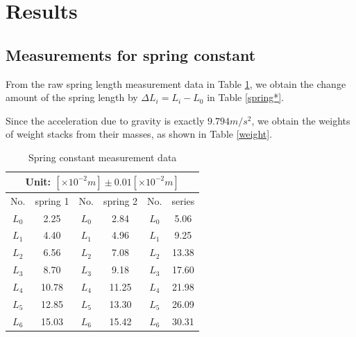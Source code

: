 \section{Results}
\subsection{Measurements for spring constant}
    From the raw spring length measurement data in Table \ref{spring}, we obtain the change amount of the spring length by $\Delta L_i=L_i-L_0$ in Table \ref{spring*}.

    Since the acceleration due to gravity is exactly $9.794m/s^2$, we obtain the weights of weight stacks from their masses, as shown in Table \ref{weight}.
    \begin{table}[h]
        \centering
        \begin{tabular}{|c|c|c|c|c|c|}
            \hline
            \multicolumn{6}{|c|}{Unit: $[\times 10^{-2}m]\pm 0.01[\times 10^{-2}m]$}\\ \hline
            No. & spring 1 & No. & spring 2 & No. & series\\ \hline
            $L_0$ & 2.25 & $L_0$ & 2.84 & $L_0$ & 5.06\\ \hline
            $L_1$ & 4.40 & $L_1$ & 4.96	& $L_1$ & 9.25\\ \hline
            $L_2$ & 6.56 & $L_2$ & 7.08 & $L_2$ & 13.38\\ \hline
            $L_3$ & 8.70 & $L_3$ & 9.18	& $L_3$ & 17.60\\ \hline
            $L_4$ & 10.78 & $L_4$ & 11.25 & $L_4$ & 21.98\\ \hline
            $L_5$ & 12.85 & $L_5$ & 13.30 & $L_5$ & 26.09\\ \hline
            $L_6$ & 15.03 & $L_6$ &	15.42 & $L_6$ &	30.31\\ \hline
        \end{tabular}
        \caption{Spring constant measurement data}\label{spring}
    \end{table}
